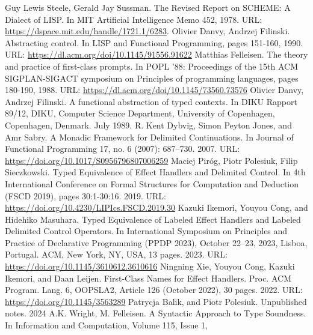   Guy Lewis Steele, Gerald Jay Sussman. The Revised Report on SCHEME: A Dialect of LISP. In MIT Artificial Intelligence Memo 452, 1978. URL: \href{https://dspace.mit.edu/handle/1721.1/6283}{https://dspace.mit.edu/handle/1721.1/6283}.
 Olivier Danvy, Andrzej Filinski. Abstracting control. In LISP and Functional Programming, pages 151-160, 1990. URL: \href{https://dl.acm.org/doi/10.1145/91556.91622}{https://dl.acm.org/doi/10.1145/91556.91622}
 Matthias Felleisen. The theory and practice of first-class prompts. In POPL '88: Proceedings of the 15th ACM SIGPLAN-SIGACT symposium on Principles of programming languages, pages 180-190, 1988. URL: \href{https://dl.acm.org/doi/10.1145/73560.73576}{https://dl.acm.org/doi/10.1145/73560.73576}
Olivier Danvy, Andrzej Filinski. A functional abstraction of typed contexts.
In DIKU Rapport 89/12, DIKU, Computer Science Department, University of Copenhagen, Copenhagen, Denmark. July 1989.
 R. Kent Dybvig, Simon Peyton Jones, and Amr Sabry. A Monadic Framework for Delimited Continuations.
 In Journal of Functional Programming 17, no. 6 (2007): 687–730.
 2007. URL:  \href{https://doi.org/10.1017/S0956796807006259}{https://doi.org/10.1017/S0956796807006259}
 Maciej Piróg,
  Piotr Polesiuk,
  Filip Sieczkowski. Typed Equivalence of Effect Handlers and Delimited Control. In 4th International Conference on Formal Structures for Computation and Deduction (FSCD 2019), pages 30:1-30:16. 2019. URL: \href{https://doi.org/10.4230/LIPIcs.FSCD.2019.30}{https://doi.org/10.4230/LIPIcs.FSCD.2019.30}
 Kazuki Ikemori, Youyou Cong, and Hidehiko Masuhara. Typed Equivalence of Labeled Effect Handlers and Labeled Delimited Control Operators.
In International Symposium on Principles and Practice of Declarative Programming (PPDP 2023), October 22–23, 2023, Lisboa, Portugal.
ACM, New York, NY, USA, 13 pages.
2023.
URL: \href{https://doi.org/10.1145/3610612.3610616}{https://doi.org/10.1145/3610612.3610616}
 Ningning Xie, Youyou Cong, Kazuki Ikemori, and Daan Leijen. First-Class Names for Effect Handlers.
Proc. ACM Program. Lang. 6, OOPSLA2, Article 126 (October 2022), 30 pages. 2022. URL: \href{https://doi.org/10.1145/3563289}{https://doi.org/10.1145/3563289}
 Patrycja Balik, and Piotr Polesiuk. Unpublished notes. 2024
 A.K. Wright, M. Felleisen.
A Syntactic Approach to Type Soundness.
In Information and Computation,
Volume 115, Issue 1,
